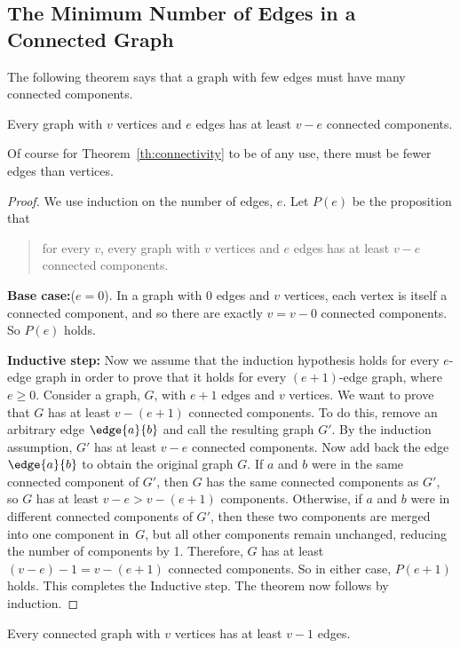 \subsection{The Minimum Number of Edges in a Connected Graph}

The following theorem says that a graph with few edges must have many
connected components.
\begin{theorem}\label{th:connectivity}
Every graph with $v$ vertices and $e$ edges has at least $v - e$ connected
components.
\end{theorem}
Of course for Theorem~\ref{th:connectivity} to be of any use, there must
be fewer edges than vertices.

\begin{proof}
We use induction on the number of edges, $e$.  Let $P(e)$ be the
proposition that
\begin{quote}
for every $v$, every graph with $v$ vertices and $e$ edges has at least
$v-e$ connected components.
\end{quote}

\textbf{Base case:}($e=0$).  In a graph with 0 edges and $v$ vertices,
each vertex is itself a connected component, and so there are exactly $v =
v - 0$ connected components.  So $P(e)$ holds.

\textbf{Inductive step:} Now we assume that the induction hypothesis
holds for every $e$-edge graph in order to prove that it holds for
every $(e+1)$-edge graph, where $e \geq 0$.  Consider a graph, $G$,
with $e + 1$ edges and $v$ vertices.  We want to prove that $G$ has at
least $v - (e+1)$ connected components.  To do this, remove an
arbitrary edge $\edge{a}{b}$ and call the resulting graph $G'$.  By
the induction assumption, $G'$ has at least $v - e$ connected
components.  Now add back the edge $\edge{a}{b}$ to obtain the
original graph $G$.  If $a$ and $b$ were in the same connected
component of $G'$, then $G$ has the same connected components as $G'$,
so $G$ has at least $v -e > v - (e+1)$ components.  Otherwise, if $a$
and $b$ were in different connected components of $G'$, then these two
components are merged into one component in~$G$, but all other
components remain unchanged, reducing the number of components by 1.
Therefore, $G$ has at least $(v - e) - 1 = v - (e+1)$ connected
components.  So in either case, $P(e+1)$ holds.  This completes the
Inductive step.  The theorem now follows by induction.
\end{proof}

\begin{corollary}
\label{cor:n-1}
Every connected graph with $v$ vertices has at least $v - 1$ edges.
\end{corollary}

